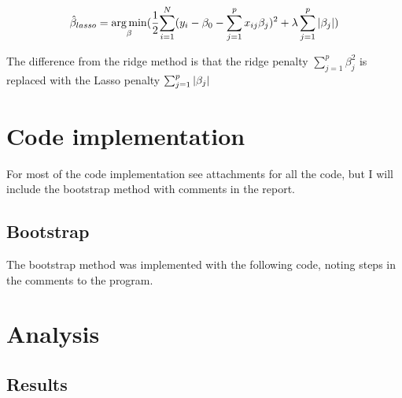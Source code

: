 \begin{equation}
\hat{\beta}_{lasso} =\operatorname*{arg\,min}_{\beta}(\frac{1}{2}{\sum_{i=1}^{N}(y_i - \beta_0 -\sum_{j=1}^{p}x_{ij}\beta_j)^2 + \lambda \sum_{j=1}^{p}\left| \beta_j \right|})
\end{equation}
\medskip

The difference from the ridge method is that the ridge penalty $\sum_{j=1}^{p}\beta_j^2$ is replaced with the Lasso penalty $\sum_{j=1}^{p}\left| \beta_j \right|$

\section{Code implementation}
For most of the code implementation see attachments for all the code, but I will include the bootstrap method with comments in the report.

\subsection{Bootstrap}

The bootstrap method was implemented with the following code, noting steps in the comments to the program.



\medskip


\section{Analysis}


\subsection{Results}

